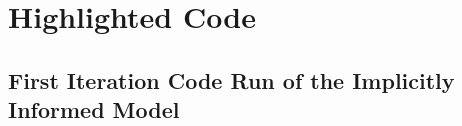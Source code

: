 \chapter{Highlighted Code}\label{chap:code}
\thispagestyle{empty}

\section{First Iteration Code Run of the Implicitly Informed Model}



 















